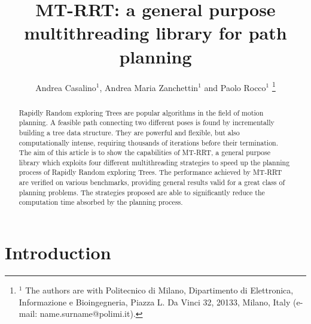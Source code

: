 \documentclass[letterpaper, 10 pt, conference]{ieeeconf}  %
\title{\LARGE \bf
MT-RRT: a general purpose multithreading library for path planning
}
\author{Andrea Casalino$^{1}$,  Andrea Maria Zanchettin$^{1}$ and Paolo Rocco$^{1}$%
\thanks{ $^{1}$ The authors are with Politecnico di Milano, Dipartimento di
Elettronica, Informazione e Bioingegneria, Piazza L. Da Vinci 32,
20133, Milano, Italy (e-mail: name.surname@polimi.it).}%
}
\begin{document}
\maketitle
\thispagestyle{empty}
\pagestyle{empty}


\begin{abstract}
Rapidly Random exploring Trees are popular algorithms in the field of motion planning.
A feasible path connecting two different poses is found by incrementally building a tree data structure. They are powerful and flexible, but also computationally intense, requiring thousands of iterations before their termination. 
The aim of this article is to show the capabilities of MT-RRT, a general purpose library which exploits four different multithreading strategies to speed up the planning process of Rapidly Random exploring Trees.
The performance achieved by MT-RRT are verified on various benchmarks, providing general results valid for a great class of planning problems.
The strategies proposed are able to significantly reduce the computation time absorbed by the planning process.
\end{abstract}


\section{Introduction}\label{sec:intro}
\end{document}
